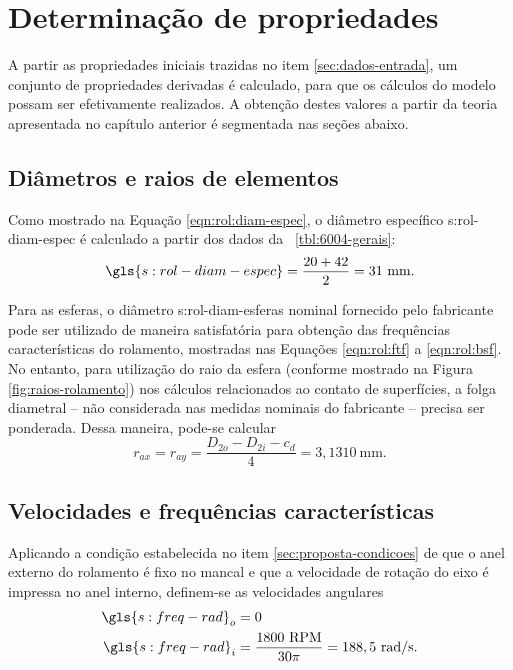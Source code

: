 \documentclass[12pt,oneside,english,brazil,lmodern,siglas,simbolos,cite=num]{ucsmonograph}
\begin{document}
	\begin{figure}[t]
		\label{fig:3d-rolamento}
	\end{figure}

	\section{Determinação de propriedades}
	A partir as propriedades iniciais trazidas no item \ref{sec:dados-entrada}, um conjunto de propriedades derivadas é calculado, para que os cálculos do modelo possam ser efetivamente realizados.
	A obtenção destes valores a partir da teoria apresentada no capítulo anterior é segmentada nas seções abaixo.

	\subsection{Diâmetros e raios de elementos}	
	Como mostrado na Equação \ref{eqn:rol:diam-espec}, o diâmetro específico \gls{s:rol-diam-espec} é calculado a partir dos dados da \tablename\ \ref{tbl:6004-gerais}:
	\begin{equation*}
		\gls{s:rol-diam-espec} = \frac{20 + 42}{2} = 31\ \text{mm}.
	\end{equation*}
	
	Para as esferas, o diâmetro \gls{s:rol-diam-esferas} nominal fornecido pelo fabricante pode ser utilizado de maneira satisfatória para obtenção das frequências características do rolamento, mostradas nas Equações \ref{eqn:rol:ftf} a \ref{eqn:rol:bsf}.
	No entanto, para utilização do raio da esfera (conforme mostrado na Figura \ref{fig:raios-rolamento}) nos cálculos relacionados ao contato de superfícies, a folga diametral -- não considerada nas medidas nominais do fabricante -- precisa ser ponderada.
	Dessa maneira, pode-se calcular
	\begin{equation}
		r_{ax} = r_{ay} = \frac{D_{2o} - D_{2i} - c_d}{4} = 3,1310\ \text{mm}.
	\end{equation}
	
	\subsection{Velocidades e frequências características}
	Aplicando a condição estabelecida no item \ref{sec:proposta-condicoes} de que o anel externo do rolamento é fixo no mancal e que a velocidade de rotação do eixo é impressa no anel interno, definem-se as velocidades angulares
	\setlength{}
	\begin{align}
		\gls{s:freq-rad}_o &= 0 \\
		\gls{s:freq-rad}_i &= \frac{1800\ \text{RPM}}{30\pi} = 188,5\ \text{rad/s}.
	\end{align}
	
\end{document}
